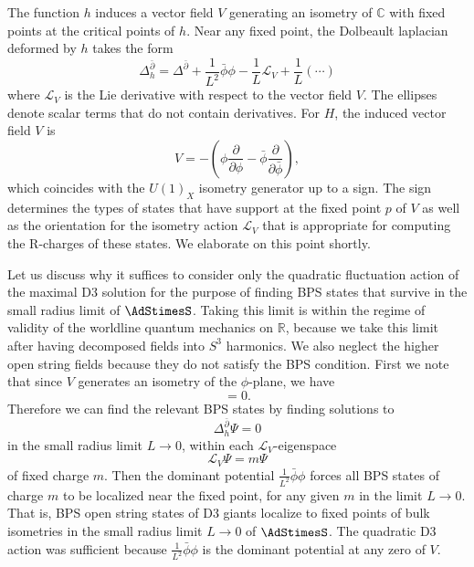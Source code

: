 \documentclass[a4paper,12pt]{article}
\begin{document}
The function $h$ induces a vector field $V$ generating an isometry of $\mathbb{C}$ with fixed points at the critical points of $h$. Near any fixed point, the Dolbeault laplacian deformed by $h$ takes the form
\begin{equation} \label{eq:dolbeault laplacian deformed}
\Delta_h^{\bar\partial} = \Delta^{\bar\partial} + \frac{1}{L^2} \bar\phi \phi - \frac{1}{L} \mathcal{L}_V + \frac{1}{L} (\cdots) %
\end{equation}
where $\mathcal{L}_V$ is the Lie derivative with respect to the vector field $V$. The ellipses denote scalar terms that do not contain derivatives. For $H$, the induced vector field $V$ is
\begin{equation}
V = - \left( \phi \frac{\partial}{\partial \phi} - \bar\phi \frac{\partial}{\partial \bar \phi} \right),
\end{equation}
which coincides with the $U(1)_X$ isometry generator up to a sign. The sign determines the types of states that have support at the fixed point $p$ of $V$ as well as the orientation for the isometry action $\mathcal{L}_V$ that is appropriate for computing the R-charges of these states. We elaborate on this point shortly.

Let us discuss why it suffices to consider only the quadratic fluctuation action of the maximal D3 solution for the purpose of finding BPS states that survive in the small radius limit of $\AdStimesS$. Taking this limit is within the regime of validity of the worldline quantum mechanics on $\mathbb{R}$, because we take this limit after having decomposed fields into $S^3$ harmonics. We also neglect the higher open string fields because they do not satisfy the BPS condition. First we note that since $V$ generates an isometry of the $\phi$-plane, we have
\begin{equation}
[\Delta_h^{\bar\partial} , \mathcal{L}_V] = 0.
\end{equation}
Therefore we can find the relevant BPS states by finding solutions to
\begin{equation}
\Delta_h^{\bar\partial} \Psi = 0
\end{equation}
in the small radius limit $L \to 0$, within each $\mathcal{L}_V$-eigenspace
\begin{equation}
\mathcal{L}_V \Psi = m \Psi
\end{equation}
of fixed charge $m$. Then the dominant potential $\frac{1}{L^2} \bar\phi \phi$ forces all BPS states of charge $m$ to be localized near the fixed point, for any given $m$ in the limit $L \to 0$. That is, BPS open string states of D3 giants localize to fixed points of bulk isometries in the small radius limit $L \to 0$ of $\AdStimesS$. The quadratic D3 action was sufficient because $\frac{1}{L^2} \bar\phi \phi$ is the dominant potential at any zero of $V$. 
\end{document}
